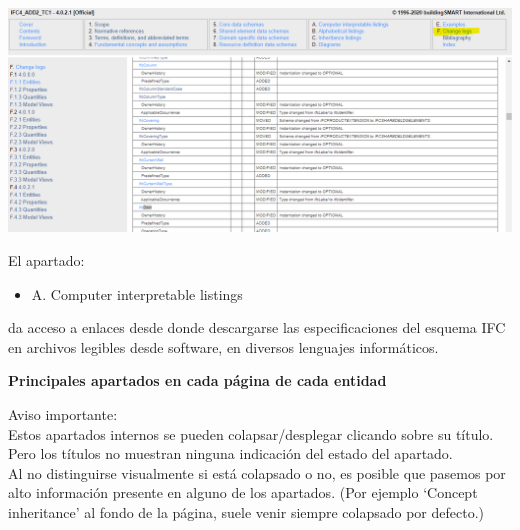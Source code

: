 \documentclass[spanish,10pt,a4paper,final,oneside]{article}
\begin{document}
\includegraphics[width=\textwidth]{IFC4 - F - Change logs}

\vspace{0.5cm}
El apartado:
\begin{itemize}
\item A. Computer interpretable listings
\end{itemize}
da acceso a enlaces desde donde descargarse las especificaciones del esquema IFC en archivos legibles desde software, en diversos lenguajes informáticos.

\vspace{2cm}
\textbf{Principales apartados en cada página de cada entidad}

Aviso importante:
\\Estos apartados internos se pueden colapsar/desplegar clicando sobre su título. Pero los títulos no muestran ninguna indicación del estado del apartado. 
\\Al no distinguirse visualmente si está colapsado o no, es posible que pasemos por alto información presente en alguno de los apartados. (Por ejemplo `Concept inheritance' al fondo de la página, suele venir siempre colapsado por defecto.)
\end{document}
